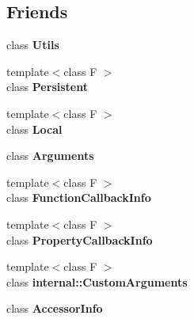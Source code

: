 \subsection*{Friends}
\begin{DoxyCompactItemize}
\item 
\hypertarget{classv8_1_1_handle_abc0f7da619e9e72510dc07ed7b5ff6d8}{}class {\bfseries Utils}\label{classv8_1_1_handle_abc0f7da619e9e72510dc07ed7b5ff6d8}

\item 
\hypertarget{classv8_1_1_handle_afaadbbd2553180545a4e018c3eeac71e}{}{\footnotesize template$<$class F $>$ }\\class {\bfseries Persistent}\label{classv8_1_1_handle_afaadbbd2553180545a4e018c3eeac71e}

\item 
\hypertarget{classv8_1_1_handle_afb872edb4aac7ba55f0da004113aa2b0}{}{\footnotesize template$<$class F $>$ }\\class {\bfseries Local}\label{classv8_1_1_handle_afb872edb4aac7ba55f0da004113aa2b0}

\item 
\hypertarget{classv8_1_1_handle_acbd2a21b98cd2cb694fd02340724b625}{}class {\bfseries Arguments}\label{classv8_1_1_handle_acbd2a21b98cd2cb694fd02340724b625}

\item 
\hypertarget{classv8_1_1_handle_a76786e6fa2d0eac5e2d4f647659d0d23}{}{\footnotesize template$<$class F $>$ }\\class {\bfseries Function\+Callback\+Info}\label{classv8_1_1_handle_a76786e6fa2d0eac5e2d4f647659d0d23}

\item 
\hypertarget{classv8_1_1_handle_a5018adab21fade2b42f4f60e45fa1083}{}{\footnotesize template$<$class F $>$ }\\class {\bfseries Property\+Callback\+Info}\label{classv8_1_1_handle_a5018adab21fade2b42f4f60e45fa1083}

\item 
\hypertarget{classv8_1_1_handle_a07108678a2af25caab612879ed7dca62}{}{\footnotesize template$<$class F $>$ }\\class {\bfseries internal\+::\+Custom\+Arguments}\label{classv8_1_1_handle_a07108678a2af25caab612879ed7dca62}

\item 
\hypertarget{classv8_1_1_handle_aa6da8bc2cce791f1f1358707f98c45d1}{}class {\bfseries Accessor\+Info}\label{classv8_1_1_handle_aa6da8bc2cce791f1f1358707f98c45d1}


\end{DoxyCompactItemize}

